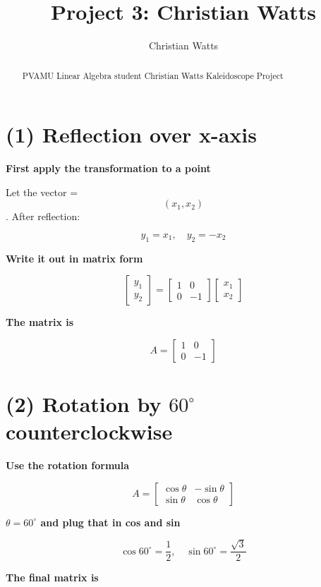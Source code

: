 \documentclass{ximera}
\title{Project 3: Christian Watts}
\author{Christian Watts}
\begin{document}
\begin{abstract}
        PVAMU Linear Algebra student Christian Watts Kaleidoscope Project
\end{abstract}
\maketitle

\section*{(1) Reflection over x-axis}

\textbf{First apply the transformation to a point}

Let the vector = $$(x_1, x_2)$$. After reflection:

\[
y_1 = x_1, \quad y_2 = -x_2
\]

\textbf{Write it out in matrix form}

\[
\begin{bmatrix}
y_1 \\
y_2
\end{bmatrix}
=
\begin{bmatrix}
1 & 0 \\
0 & -1
\end{bmatrix}
\begin{bmatrix}
x_1 \\
x_2
\end{bmatrix}
\]

\textbf{The matrix is}

\[
A =
\begin{bmatrix}
1 & 0 \\
0 & -1
\end{bmatrix}
\]

\section*{(2) Rotation by $60^\circ$ counterclockwise}

\textbf{ Use the rotation formula}

\[
A =
\begin{bmatrix}
\cos \theta & -\sin \theta \\
\sin \theta & \cos \theta
\end{bmatrix}
\]

\textbf{ $\theta = 60^\circ$ and plug that in cos and sin}

\[
\cos 60^\circ = \frac{1}{2}, \quad \sin 60^\circ = \frac{\sqrt{3}}{2}
\]

\textbf{The final matrix is}
\end{document}
